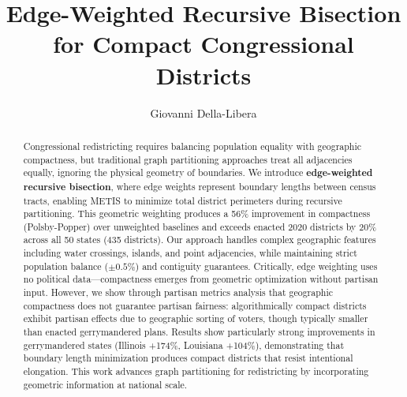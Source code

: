 \documentclass[sigconf,review]{acmart}
\title{Edge-Weighted Recursive Bisection for Compact Congressional Districts}
\author{Giovanni Della-Libera}
\begin{document}
\begin{abstract}
Congressional redistricting requires balancing population equality with geographic compactness, but traditional graph partitioning approaches treat all adjacencies equally, ignoring the physical geometry of boundaries. We introduce \textbf{edge-weighted recursive bisection}, where edge weights represent boundary lengths between census tracts, enabling METIS to minimize total district perimeters during recursive partitioning. This geometric weighting produces a 56\% improvement in compactness (Polsby-Popper) over unweighted baselines and exceeds enacted 2020 districts by 20\% across all 50 states (435 districts). Our approach handles complex geographic features including water crossings, islands, and point adjacencies, while maintaining strict population balance ($\pm 0.5\%$) and contiguity guarantees. Critically, edge weighting uses no political data---compactness emerges from geometric optimization without partisan input. However, we show through partisan metrics analysis that geographic compactness does not guarantee partisan fairness: algorithmically compact districts exhibit partisan effects due to geographic sorting of voters, though typically smaller than enacted gerrymandered plans. Results show particularly strong improvements in gerrymandered states (Illinois +174\%, Louisiana +104\%), demonstrating that boundary length minimization produces compact districts that resist intentional elongation. This work advances graph partitioning for redistricting by incorporating geometric information at national scale.
\end{abstract}


\maketitle










\end{document}
